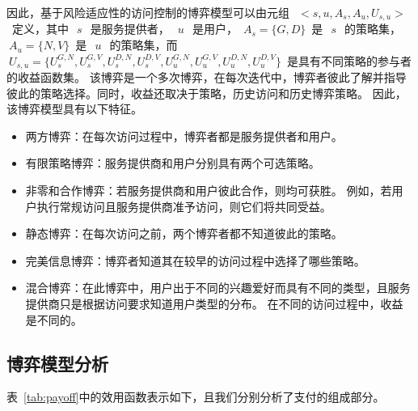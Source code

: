 因此，基于风险适应性的访问控制的博弈模型可以由元组~$~<s,u,A_s,A_u,U_{s,u}>~$~定义，其中~$~s~$~是服务提供者，~$~u~$~是用户，~$A_s=\{G,D\}$~是~$~s~$~的策略集，~$~A_u=\{N,V\}$~是~$~u~$~的策略集，而~$~U_{s,u}=\{U_s^{G,N}, U_s^{G,V}, U_s^{D,N}, U_s^{D,V}, U_u^{G,N}, U_u^{G,V}, U_u^{D,N}, U_u^{D,V}\}$~是具有不同策略的参与者的收益函数集。 该博弈是一个多次博弈，在每次迭代中，博弈者彼此了解并指导彼此的策略选择。同时，收益还取决于策略，历史访问和历史博弈策略。 因此，该博弈模型具有以下特征。
\begin{itemize}
	\item 两方博弈：在每次访问过程中，博弈者都是服务提供者和用户。
	\item 有限策略博弈：服务提供商和用户分别具有两个可选策略。
	\item 非零和合作博弈：若服务提供商和用户彼此合作，则均可获胜。 例如，若用户执行常规访问且服务提供商准予访问，则它们将共同受益。
	\item 静态博弈：在每次访问之前，两个博弈者都不知道彼此的策略。
	\item 完美信息博弈：博弈者知道其在较早的访问过程中选择了哪些策略。
	\item 混合博弈：在此博弈中，用户出于不同的兴趣爱好而具有不同的类型，且服务提供商只是根据访问要求知道用户类型的分布。 在不同的访问过程中，收益是不同的。
\end{itemize}

\subsection{博弈模型分析}

表~\ref{tab:payoff}中的效用函数表示如下，且我们分别分析了支付的组成部分。

